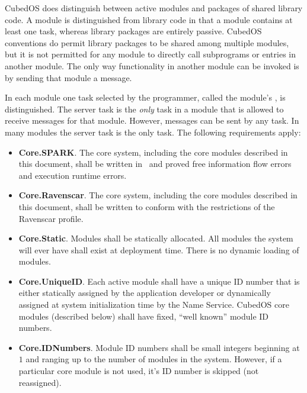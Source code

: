 CubedOS does distinguish between active modules and packages of shared library code. A module is
distinguished from library code in that a module contains at least one task, whereas library
packages are entirely passive. CubedOS conventions do permit library packages to be shared among
multiple modules, but it is not permitted for any module to directly call subprograms or entries
in another module.  The only way
functionality in another module can be invoked is by sending that module a message.

In each module one task selected by the programmer, called the module's ,
is distinguished. The server task is the \emph{only} task in a module that is allowed to receive
messages for that module. However, messages can be sent by any task. In many modules the server
task is the only task. The following requirements apply:

\begin{itemize}
\item \textbf{Core.SPARK}. The core system, including the core modules described in this
  document, shall be written in \SPARK\ and proved free information flow errors and execution
  runtime errors.
\item \textbf{Core.Ravenscar}. The core system, including the core modules described in this
  document, shall be written to conform with the restrictions of the Ravenscar profile. 
\item \textbf{Core.Static}. Modules shall be statically allocated. All modules the system will
  ever have shall exist at deployment time. There is no dynamic loading of modules. 
\item \textbf{Core.UniqueID}. Each active module shall have a unique ID number that is either
  statically assigned by the application developer or dynamically assigned at system
  initialization time by the Name Service. CubedOS core modules (described below) shall have
  fixed, ``well known'' module ID numbers.
\item \textbf{Core.IDNumbers}. Module ID numbers shall be small integers beginning at $1$ and
  ranging up to the number of modules in the system. However, if a particular core module is not
  used, it's ID number is skipped (not reassigned).
\end{itemize}

